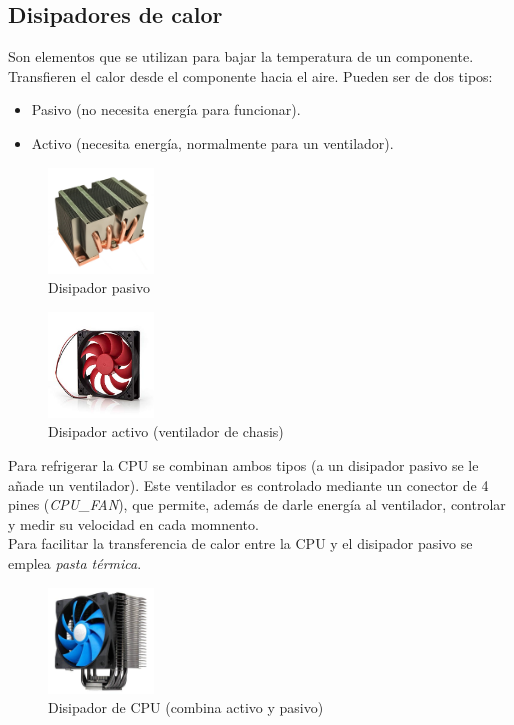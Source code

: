 \documentclass[12pt,spanish]{article}
\begin{document}
\subsection{Disipadores de calor}
Son elementos que se utilizan para bajar la temperatura de un componente. Transfieren el calor desde el componente hacia el aire. Pueden ser de dos tipos:
\begin{itemize}
	\item Pasivo (no necesita energía para funcionar).

	\item Activo (necesita energía, normalmente para un ventilador).
\end{itemize}
\begin{figure}[H]
	\centering
	\includegraphics[width=0.25\textwidth]{passive.jpg}
	\caption{Disipador pasivo}
\end{figure}

\begin{figure}[H]
	\centering
	\includegraphics[width=0.25\textwidth]{fan.jpg}
	\caption{Disipador activo (ventilador de chasis)}
\end{figure}

Para refrigerar la CPU se combinan ambos tipos (a un disipador pasivo se le añade un ventilador). Este ventilador es controlado mediante un conector de 4 pines (\textit{CPU\_FAN}), que permite, además de darle energía al ventilador, controlar y medir su velocidad en cada momnento.\\

Para facilitar la transferencia de calor entre la CPU y el disipador pasivo se emplea \textit{pasta térmica}.

\begin{figure}[H]
	\centering
	\includegraphics[width=0.25\textwidth]{cpufan.jpg}
	\caption{Disipador de CPU (combina activo y pasivo)}
\end{figure}
\end{document}
